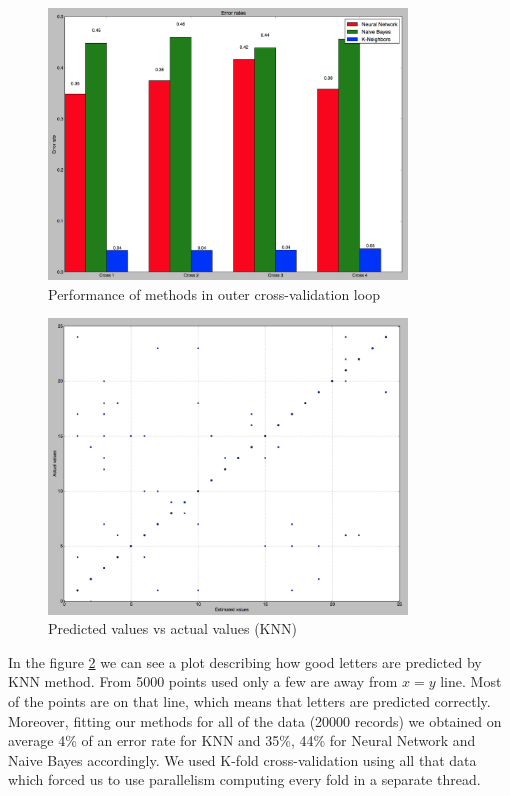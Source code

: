 \begin{figure}[!t]
	\centering
	\includegraphics[width=0.85\textwidth]{figures/performance}
	\caption{Performance of methods in outer cross-validation loop}
	\label{fig:performance}
\end{figure} 
\begin{figure}[!t]
	\centering
	\includegraphics[width=0.85\textwidth]{figures/predictions}
	\caption{Predicted values vs actual values (KNN)}
	\label{fig:predictions}
\end{figure}
In the figure \ref{fig:predictions} we can see a plot describing how good letters are predicted by KNN method. 
From 5000 points used only a few are away from $x=y$ line. Most of the points are on that line, which means that
letters are predicted correctly. \\

Moreover, fitting our methods for all of the data (20000 records) we obtained on average 4\% of an error rate for KNN and 35\%, 44\% 
for Neural Network and Naive Bayes accordingly. We used K-fold cross-validation using all that data which forced us to use parallelism
computing every fold in a separate thread. 
